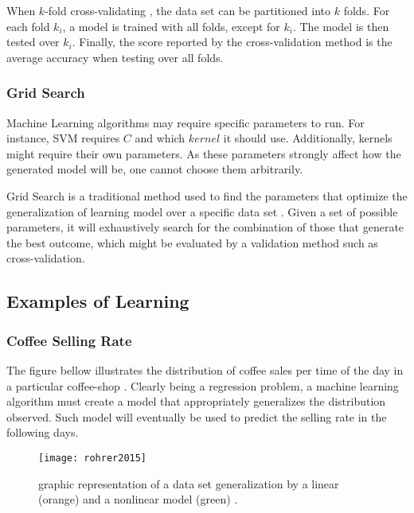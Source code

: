 When $k$-fold cross-validating \cite{crossvalid}, the data set can be partitioned into $k$ folds. For each fold $k_i$, a model is trained with all folds, except for $k_i$. The model is then tested over $k_i$. Finally, the score reported by the cross-validation method is the average accuracy when testing over all folds.

\subsubsection{Grid Search}

Machine Learning algorithms may require specific parameters to run. For instance, SVM requires $C$ and which $kernel$ it should use. Additionally, kernels might require their own parameters. As these parameters strongly affect how the generated model will be, one cannot choose them arbitrarily.

Grid Search is a traditional method used to find the parameters that optimize the generalization of learning model over a specific data set \cite{gridsearch}. Given a set of possible parameters, it will exhaustively search for the combination of those that generate the best outcome, which might be evaluated by a validation method such as cross-validation.

\subsection{Examples of Learning}

\subsubsection{Coffee Selling Rate}

The figure bellow illustrates the distribution of coffee sales per time of the day in a particular coffee-shop \cite{roh2015}. Clearly being a regression problem, a machine learning algorithm must create a model that appropriately generalizes the distribution observed. Such model will eventually be used to predict the selling rate in the following days.

\begin{figure}[H]
	\centering
	\captionsetup{justification=centering}

	\texttt{[image: rohrer2015]}
	\caption{graphic representation of a data set generalization by a linear (orange) and a nonlinear model (green) \cite{roh2015}.}
	\label{fig:rohrer2015}
\end{figure}

